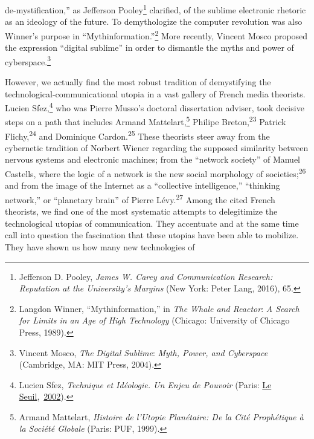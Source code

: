 \documentclass{tufte-handout}
\begin{document}
de-mystification,'' as Jefferson
Pooley\footnote{Jefferson D. Pooley, \emph{James W. Carey and Communication Research:
  Reputation at the University's Margins} (New York: Peter Lang, 2016),
  65.
} clarified, of the sublime
electronic rhetoric as an ideology of the future. To demythologize the
computer revolution was also Winner's purpose in
``Mythinformation.''\footnote{Langdon Winner, ``Mythinformation,'' in \emph{The Whale and Reactor}:
  \emph{A Search for Limits in an Age of High Technology} (Chicago:
  University of Chicago Press, 1989).
} More
recently, Vincent Mosco proposed the expression ``digital sublime'' in
order to dismantle the myths and power of
cyberspace.\footnote{Vincent Mosco, \emph{The} \emph{Digital Sublime}: \emph{Myth, Power,
  and Cyberspace} (Cambridge, MA: MIT Press, 2004).
}

However, we actually find the most robust tradition of demystifying the
technological-communicational utopia in a vast gallery of French media
theorists. Lucien Sfez,\footnote{Lucien Sfez, \emph{Technique et Idéologie. Un Enjeu de Pouvoir}
  (Paris: \href{https://fr.wikipedia.org/wiki/Le_Seuil}{Le
  Seuil},~\href{https://fr.wikipedia.org/wiki/2002}{2002}).
} who was
Pierre Musso's doctoral dissertation adviser, took decisive steps on a
path that includes Armand
Mattelart,\footnote{Armand Mattelart, \emph{Histoire de l'Utopie Planétaire: De la Cité
  Prophétique à la Société Globale} (Paris: PUF, 1999).
} Philipe
Breton,\textsuperscript{23} Patrick
Flichy,\textsuperscript{24} and Dominique
Cardon.\textsuperscript{25} These theorists steer
away from the cybernetic tradition of Norbert Wiener regarding the
supposed similarity between nervous systems and electronic machines;
from the ``network society'' of Manuel Castells, where the logic of a
network is the new social morphology of
societies;\textsuperscript{26} and from the image of
the Internet as a ``collective intelligence,'' ``thinking network,'' or
``planetary brain'' of Pierre
Lévy.\textsuperscript{27} Among the cited French
theorists, we find one of the most systematic attempts to delegitimize
the technological utopias of communication. They accentuate and at the
same time call into question the fascination that these utopias have
been able to mobilize. They have shown us how many new technologies of
\end{document}
